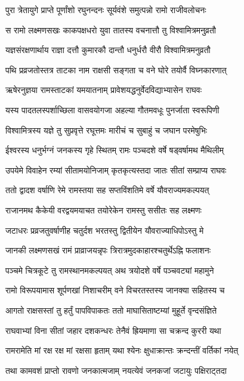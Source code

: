 \twolineshloka
{पुरा त्रेतायुगे प्राप्ते पूर्णांशो रघुनन्दनः}
{सूर्यवंशे समुत्पन्नो रामो राजीवलोचनः}%

\twolineshloka
{स रामो लक्ष्मणसखः काकपक्षधरो युवा}
{तातस्य वचनात्तौ तु विश्वामित्रमनुव्रतौ}%

\twolineshloka
{यज्ञसंरक्षणार्थाय राज्ञा दत्तौ कुमारकौ}
{दान्तौ धनुर्धरौ वीरौ विश्वामित्रमनुव्रतौ}%

\twolineshloka
{पथि प्रव्रजतोस्तत्र ताटका नाम राक्षसी}
{सङ्गता च वने घोरे तयोर्वै विघ्नकारणात्}%

\twolineshloka
{ऋषेरनुज्ञया रामस्ताटकां यमयातनाम्}
{प्रावेशयद्धनुर्वेदविद्याभ्यासेन राघवः}%

\twolineshloka
{यस्य पादतलस्पर्शाच्छिला वासवयोगजा}
{अहल्या गौतमवधूः पुनर्जाता स्वरूपिणी}%

\twolineshloka
{विश्वामित्रस्य यज्ञे तु सुप्रवृत्ते रघूत्तमः}
{मारीचं च सुबाहुं च जघान परमेषुभिः}%

\twolineshloka
{ईश्वरस्य धनुर्भग्नं जनकस्य गृहे स्थितम्}
{रामः पञ्चदशे वर्षे षड्वर्षामथ मैथिलीम्}%

\twolineshloka
{उपयेमे विवाहेन रम्यां सीतामयोनिजाम्}
{कृतकृत्यस्तदा जातः सीतां सम्प्राप्य राघवः}%

\twolineshloka
{ततो द्वादश वर्षाणि रेमे रामस्तया सह}
{सप्तविंशतिमे वर्षे यौवराज्यमकल्पयत्}%

\twolineshloka
{राजानमथ कैकेयी वरद्वयमयाचत}
{तयोरेकेन रामस्तु ससीतः सह लक्ष्मणः}%

\twolineshloka
{जटाधरः प्रव्रजतुवर्षाणीह चतुर्दश}
{भरतस्तु द्वितीयेन यौवराज्याधिपोऽस्तु मे}%

\twolineshloka
{जानकी लक्ष्मणसखं रामं प्राव्राजयन्नृपः}
{त्रिरात्रमुदकाहारश्चतुर्थेऽह्नि फलाशनः}%

\twolineshloka
{पञ्चमे चित्रकूटे तु रामस्थानमकल्पयत्}
{अथ त्रयोदशे वर्षे पञ्चवट्यां महामुने}%

\twolineshloka
{रामो विरूपयामास शूर्पणखां निशाचरीम्}
{वने विचरतस्तस्य जानक्या सहितस्य च}%

\twolineshloka
{आगतो राक्षसस्तां तु हर्तुं पापविपाकतः}
{ततो माघासिताष्टम्यां मुहूर्ते वृन्दसंज्ञिते}%

\twolineshloka
{राघवाभ्यां विना सीतां जहार दशकन्धरः}
{तेनैवं ह्रियमाणा सा चक्रन्द कुररी यथा}%

\twolineshloka
{रामरामेति मां रक्ष रक्ष मां रक्षसा हृताम्}
{यथा श्येनः क्षुधाक्रान्तः क्रन्दन्तीं वर्तिकां नयेत्}%

\twolineshloka
{तथा कामवशं प्राप्तो रावणो जनकात्मजाम्}
{नयत्येवं जनकजां जटायुः पक्षिराट्तदा}%

